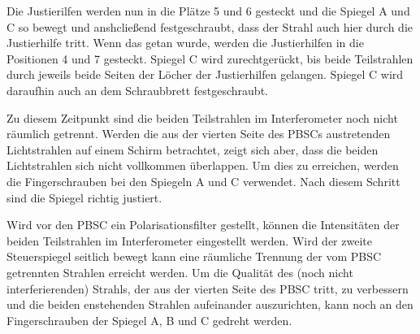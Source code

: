 Die Justierilfen werden nun in die Plätze 5 und 6 gesteckt und die Spiegel A und C so bewegt und anshcließend festgeschraubt, dass der Strahl auch hier durch die Justierhilfe tritt. Wenn das getan wurde, werden die Justierhilfen in die Positionen 4 und 7 gesteckt. Spiegel C wird zurechtgerückt, bis beide Teilstrahlen durch jeweils beide Seiten der Löcher der Justierhilfen gelangen. Spiegel C wird daraufhin auch an dem Schraubbrett festgeschraubt.

Zu diesem Zeitpunkt sind die beiden Teilstrahlen im Interferometer noch nicht räumlich getrennt. Werden die aus der vierten Seite des PBSCs austretenden Lichtstrahlen auf einem Schirm betrachtet, zeigt
sich aber, dass die beiden Lichtstrahlen sich nicht vollkommen überlappen. Um dies zu erreichen, werden die Fingerschrauben bei den Spiegeln A und C verwendet. Nach diesem Schritt sind die Spiegel
richtig justiert.

Wird vor den PBSC ein Polarisationsfilter gestellt, können die Intensitäten der beiden Teilstrahlen im Interferometer eingestellt werden. Wird der zweite Steuerspiegel seitlich bewegt kann eine räumliche Trennung der vom PBSC getrennten Strahlen erreicht werden. Um die Qualität des (noch nicht interferierenden) Strahls, der aus der vierten Seite des PBSC tritt, zu verbessern und die beiden enstehenden Strahlen aufeinander auszurichten, kann noch an den Fingerschrauben der Spiegel A, B und C gedreht werden.
